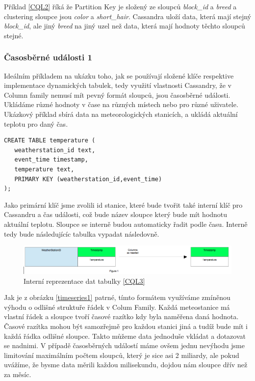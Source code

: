 Příklad \ref{CQL2} říká že Partition Key je složený ze sloupců \emph{block\_id} a  \emph{breed} a clustering sloupce jsou \emph{color} a \emph{short\_hair}. Cassandra uloží data, která mají stejný \emph{block\_id}, ale jiný \emph{breed} na jiný uzel než data, která mají hodnoty těchto sloupců stejné.  


\subsubsection*{Časosběrné události 1}
Ideálním příkladem na ukázku toho, jak se používají složené klíče respektive implementace dynamických tabulek, tedy využití vlastnosti Cassandry, že v Column family nemusí mít pevný formát sloupců, jsou časosběrné události. Ukládáme různé hodnoty v čase na různých místech nebo pro různé uživatele. Ukázkový příklad sbírá data na meteorologických stanicích, a ukládá aktuální teplotu pro daný čas.

\begin{lstlisting}[caption={Dynamická tabulka 1},label=CQL3]
CREATE TABLE temperature (
   weatherstation_id text,
   event_time timestamp,
   temperature text,
   PRIMARY KEY (weatherstation_id,event_time)
);
\end{lstlisting}

Jako primární klíč jsme zvolili id stanice, které bude tvořit také interní klíč pro Cassandru a čas události, což bude název sloupce který bude mít hodnotu aktuální teplotu. Sloupce se interně budou automaticky řadit podle času. Interně tedy bude následujícíc tabulka vypadat následovně. 

\begin{figure}[h]
\centering
\includegraphics[scale=0.4]{images/timeseries1}
\caption{Interní reprezentace dat tabulky \ref{CQL3}}
\label{fig:timeseries1}
\end{figure}

Jak je z obrázku \ref{timeseries1} patrné, tímto formátem využíváme zmíněnou výhodu o odlišné struktuře řádek v Colum Family. Každá meteostanice má vlastní řádek a sloupce tvoří časové razítko kdy byla naměřena daná hodnota. Časové razítka mohou být samozřejmě pro každou stanici jiná a tudíž bude mít i každá řádka odlišné sloupce. Takto můžeme data jednoduše vkládat a dotazovat se nadnimi. V případě časosběrných událostí máme ovšem jednu nevýhodu jsme limitování maximálním počtem sloupců, který je sice asi 2 miliardy, ale pokud uvážíme, že bysme data měrili každou milisekundu, dojdou nám sloupce dřív než za měsíc.  

